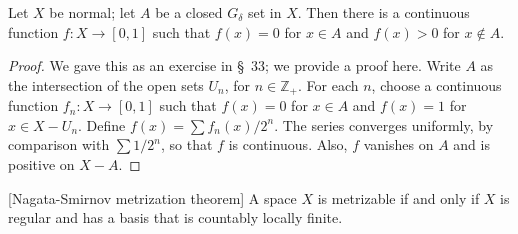 \begin{lemma}
\label{lem:\thetheorem}
 Let \(X\) be normal; let \(A\) be a closed \(G_{\delta }\) set in \(X\). Then there is a continuous function \(f : X \rightarrow [{0,1}]\) such that \(f(x) = 0\) for \(x \in A\) and \(f(x) > 0\) for \(x \notin A\).
\end{lemma}

\begin{proof}
 We gave this as an exercise in \S\ 33; we provide a proof here. Write \(A\) as the intersection of the open sets \(U_{n}\), for \(n \in {\mathbb{Z}}_{ + }\). For each \(n\), choose a continuous function \(f_{n} : X \rightarrow [{0,1}]\) such that \(f(x) = 0\) for \(x \in A\) and \(f(x) = 1\) for \(x \in X - U_{n}\). Define \(f(x) = \sum {f}_{n}(x) /2^{n}\). The series converges uniformly, by comparison with \(\sum 1/2^{n}\), so that \(f\) is continuous. Also, \(f\) vanishes on \(A\) and is positive on \(X - A\).
\end{proof}
\begin{theorem}
\label{thm:\thetheorem}[Nagata-Smirnov metrization theorem]
 A space \(X\) is metrizable if and only if \(X\) is regular and has a basis that is countably locally finite.
\end{theorem}


